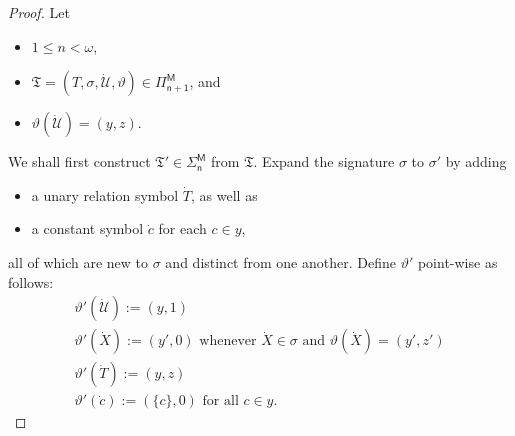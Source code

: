 \documentclass[12pt, twoside]{memoir}
\numberwithin{equation}{section}
\theoremstyle{definition}
\theoremstyle{remark}
\theoremstyle{definition}
\theoremstyle{definition}
\theoremstyle{definition}
\theoremstyle{remark}
\begin{document}
\begin{proof}
Let 
\begin{itemize}
    \item $1 \leq n < \omega$,
    \item $\mathfrak{T}  = (T, \sigma, \dot{\mathcal{U}}, \vartheta) \in \mathsf{\Pi^M_{n+1}}$, and 
    \item $\vartheta(\dot{\mathcal{U}}) = (y, z)$.
\end{itemize} 
We shall first construct $\mathfrak{T}' \in \mathsf{\Sigma^M_n}$ from $\mathfrak{T}$. Expand the signature $\sigma$ to $\sigma'$ by adding 
\begin{itemize}
    \item a unary relation symbol $\dot{T}$, as well as
    \item a constant symbol $\dot{c}$ for each $c \in y$, 
\end{itemize}
all of which are new to $\sigma$ and distinct from one another. Define $\vartheta'$ point-wise as follows:
\begin{gather*}
    \vartheta'(\dot{\mathcal{U}}) := (y, 1) \\
    \vartheta'(\dot{X}) := (y', 0) \text{ whenever } \dot{X} \in \sigma \text{ and } \vartheta(\dot{X}) = (y', z') \\
    \vartheta'(\dot{T}) := (y, z) \\
    \vartheta'(\dot{c}) := (\{c\}, 0) \text{ for all } c \in y \text{.}
\end{gather*}


\end{proof}
\end{document}
